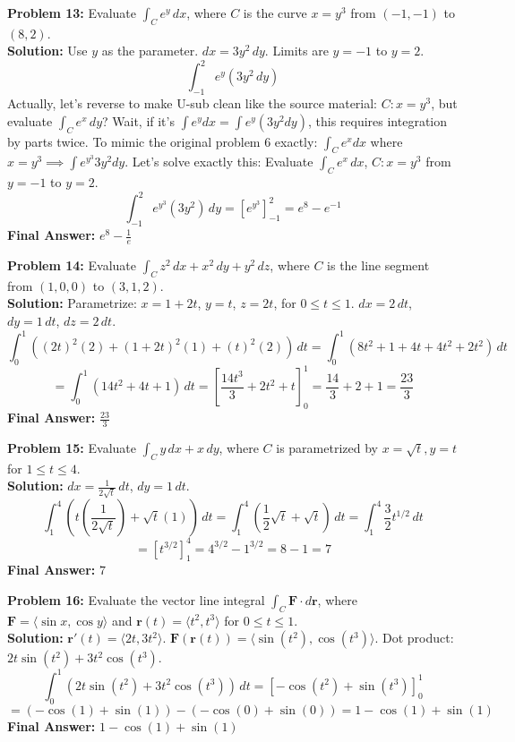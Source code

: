 \documentclass[11pt]{article}
\begin{document}
\textbf{Problem 13:} Evaluate $\int_C e^y \,dx$, where $C$ is the curve $x = y^3$ from $(-1, -1)$ to $(8, 2)$.
\\
\textbf{Solution:} Use $y$ as the parameter. $dx = 3y^2 \,dy$. Limits are $y=-1$ to $y=2$.
$$ \int_{-1}^2 e^y (3y^2 \,dy) $$
Actually, let's reverse to make U-sub clean like the source material: $C: x=y^3$, but evaluate $\int_C e^x \,dy$?
Wait, if it's $\int e^y dx = \int e^y (3y^2 dy)$, this requires integration by parts twice. To mimic the original problem 6 exactly: $\int_C e^x dx$ where $x=y^3 \implies \int e^{y^3} 3y^2 dy$. Let's solve exactly this:
Evaluate $\int_C e^x \,dx$, $C: x=y^3$ from $y=-1$ to $y=2$.
$$ \int_{-1}^2 e^{y^3} (3y^2) \,dy = \left[ e^{y^3} \right]_{-1}^2 = e^8 - e^{-1} $$
\textbf{Final Answer:} $e^8 - \frac{1}{e}$
\vspace{0.5cm}

\textbf{Problem 14:} Evaluate $\int_C z^2 \,dx + x^2 \,dy + y^2 \,dz$, where $C$ is the line segment from $(1,0,0)$ to $(3,1,2)$.
\\
\textbf{Solution:} Parametrize: $x = 1+2t$, $y = t$, $z = 2t$, for $0 \le t \le 1$.
$dx = 2 \,dt$, $dy = 1 \,dt$, $dz = 2 \,dt$.
$$ \int_0^1 ((2t)^2(2) + (1+2t)^2(1) + (t)^2(2)) \,dt = \int_0^1 (8t^2 + 1 + 4t + 4t^2 + 2t^2) \,dt $$
$$ = \int_0^1 (14t^2 + 4t + 1) \,dt = \left[ \frac{14t^3}{3} + 2t^2 + t \right]_0^1 = \frac{14}{3} + 2 + 1 = \frac{23}{3} $$
\textbf{Final Answer:} $\frac{23}{3}$
\vspace{0.5cm}

\textbf{Problem 15:} Evaluate $\int_C y \,dx + x \,dy$, where $C$ is parametrized by $x = \sqrt{t}, y = t$ for $1 \le t \le 4$.
\\
\textbf{Solution:} $dx = \frac{1}{2\sqrt{t}} \,dt$, $dy = 1 \,dt$.
$$ \int_1^4 \left(t \left(\frac{1}{2\sqrt{t}}\right) + \sqrt{t}(1)\right) \,dt = \int_1^4 \left(\frac{1}{2}\sqrt{t} + \sqrt{t}\right) \,dt = \int_1^4 \frac{3}{2} t^{1/2} \,dt $$
$$ = \left[ t^{3/2} \right]_1^4 = 4^{3/2} - 1^{3/2} = 8 - 1 = 7 $$
\textbf{Final Answer:} $7$
\vspace{0.5cm}

\textbf{Problem 16:} Evaluate the vector line integral $\int_C \mathbf{F} \cdot d\mathbf{r}$, where $\mathbf{F} = \langle \sin x, \cos y \rangle$ and $\mathbf{r}(t) = \langle t^2, t^3 \rangle$ for $0 \le t \le 1$.
\\
\textbf{Solution:} $\mathbf{r}'(t) = \langle 2t, 3t^2 \rangle$.
$\mathbf{F}(\mathbf{r}(t)) = \langle \sin(t^2), \cos(t^3) \rangle$.
Dot product: $2t\sin(t^2) + 3t^2\cos(t^3)$.
$$ \int_0^1 (2t\sin(t^2) + 3t^2\cos(t^3)) \,dt = \left[ -\cos(t^2) + \sin(t^3) \right]_0^1 $$
$$ = (-\cos(1) + \sin(1)) - (-\cos(0) + \sin(0)) = 1 - \cos(1) + \sin(1) $$
\textbf{Final Answer:} $1 - \cos(1) + \sin(1)$
\vspace{0.5cm}
\end{document}
